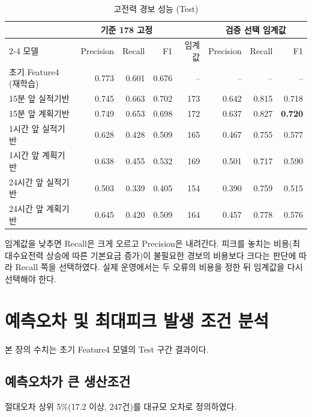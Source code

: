 \documentclass[11pt,a4paper]{article}
\begin{document}
\begin{table}[H]
\centering\small
\begin{tabular}{lrrrrrrr}
\toprule
 & \multicolumn{3}{c}{기준 178 고정} & & \multicolumn{3}{c}{검증 선택 임계값} \\
\cmidrule{2-4}\cmidrule{6-8}
모델 & Precision & Recall & F1 & 임계값 & Precision & Recall & F1 \\
\midrule
초기 Feature4 (재학습) & 0.773 & 0.601 & 0.676 & -- & -- & -- & -- \\
15분 앞 실적기반 & 0.745 & 0.663 & 0.702 & 173 & 0.642 & 0.815 & 0.718 \\
15분 앞 계획기반 & 0.749 & 0.653 & 0.698 & 172 & 0.637 & 0.827 & \textbf{0.720} \\
1시간 앞 실적기반 & 0.628 & 0.428 & 0.509 & 165 & 0.467 & 0.755 & 0.577 \\
1시간 앞 계획기반 & 0.638 & 0.455 & 0.532 & 169 & 0.501 & 0.717 & 0.590 \\
24시간 앞 실적기반 & 0.503 & 0.339 & 0.405 & 154 & 0.390 & 0.759 & 0.515 \\
24시간 앞 계획기반 & 0.645 & 0.420 & 0.509 & 164 & 0.457 & 0.778 & 0.576 \\
\bottomrule
\end{tabular}
\caption{고전력 경보 성능 (Test)}
\end{table}

임계값을 낮추면 Recall은 크게 오르고 Precision은 내려간다. 피크를 놓치는 비용(최대수요전력 상승에 따른 기본요금 증가)이 불필요한 경보의 비용보다 크다는 판단에 따라 Recall 쪽을 선택하였다. 실제 운영에서는 두 오류의 비용을 정한 뒤 임계값을 다시 선택해야 한다.

\section{예측오차 및 최대피크 발생 조건 분석}
본 장의 수치는 초기 Feature4 모델의 Test 구간 결과이다.

\subsection{예측오차가 큰 생산조건}
절대오차 상위 5\%(17.2 이상, 247건)를 대규모 오차로 정의하였다.
\end{document}
